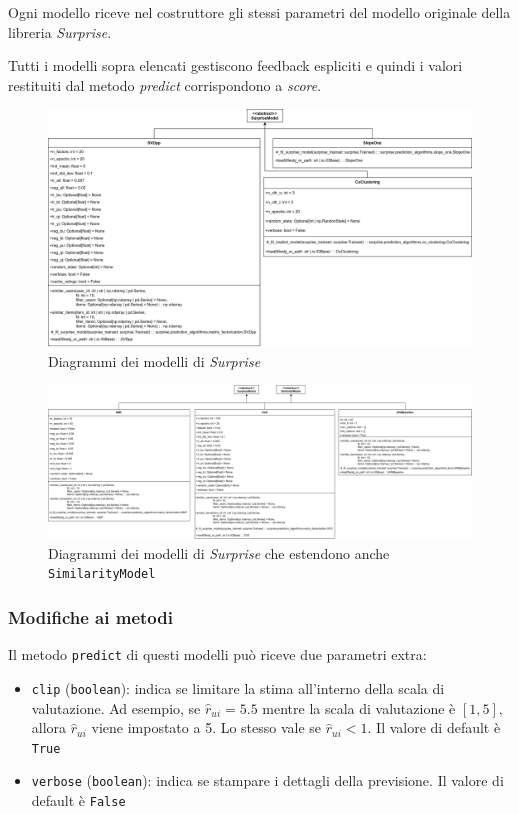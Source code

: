 Ogni modello riceve nel costruttore gli stessi parametri del modello originale della libreria \textit{Surprise}.

Tutti i modelli sopra elencati gestiscono feedback espliciti e quindi i valori restituiti dal metodo \textit{predict} corrispondono a \textit{score}.


\begin{figure}[H]
    \centering
    \includegraphics[angle=90, scale=0.14]{figures/UML/models/surprise_models.png}
    \caption{Diagrammi dei modelli di \textit{Surprise}}
\end{figure}

\begin{figure}[H]
    \centering
    \includegraphics[angle=90, scale=0.095]{figures/UML/models/surprise_similarity_models.png}
    \caption{Diagrammi dei modelli di \textit{Surprise} che estendono anche \texttt{SimilarityModel}}
\end{figure}

\subsubsection{Modifiche ai metodi}

Il metodo \texttt{predict} di questi modelli può riceve due parametri extra:

\begin{itemize}
    \item \texttt{clip} (\texttt{boolean}): indica se limitare la stima all'interno della scala di valutazione. Ad esempio, se $\hat{r}_{ui} = 5.5$ mentre la scala di valutazione è $[1, 5],$ allora $\hat{r}_{ui}$ viene impostato a 5. Lo stesso vale se $\hat{r}_{ui} < 1.$ Il valore di default è \texttt{True}
    \item \texttt{verbose} (\texttt{boolean}): indica se stampare i dettagli della previsione. Il valore di default è \texttt{False}
\end{itemize}

